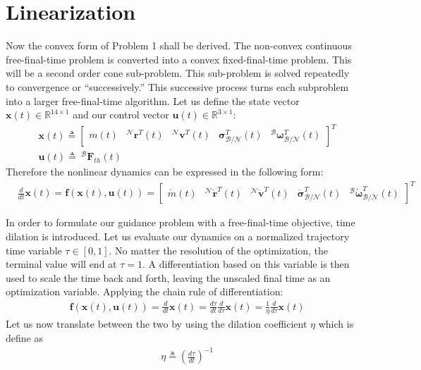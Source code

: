 \documentclass[conf]{new-aiaa}
\begin{document}

\section{Linearization}
Now the convex form of Problem 1 shall be derived. The non-convex continuous free-final-time problem is converted into a convex fixed-final-time problem. This will be a second order cone sub-problem. This sub-problem is solved repeatedly to convergence or ``successively.'' This successive process turns each subproblem into a larger free-final-time algorithm.
Let us define the state vector $\mathbf{x}(t) \in \mathbb{R}^{14\times 1}$ and our control vector $\mathbf{u}(t) \in \mathbb{R}^{3\times 1}$:
\begin{align}
& \mathbf{x}(t) \triangleq 
	\begin{bmatrix}
	m(t) & ^\mathcal{N}\mathbf{r}^T(t) & ^\mathcal{N}\mathbf{v}^T(t) & \boldsymbol{\sigma}_\mathcal{B/N}^T(t) & ^\mathcal{B}\bm{\omega}_\mathcal{B/N}^T(t)   
	\end{bmatrix}^T \\
& \mathbf{u}(t) \triangleq \ ^\mathcal{B}\mathbf{F}_{th}(t)  
\end{align}
Therefore the nonlinear dynamics can be expressed in the following form:
\begin{align}
& \frac{d}{dt}\mathbf{x}(t) = \mathbf{f}(\mathbf{x}(t), \mathbf{u}(t)) =  
	\begin{bmatrix}
	\dot{m}(t) & ^\mathcal{N}\dot{\mathbf{r}}^T(t) & ^\mathcal{N}\dot{\mathbf{v}}^T(t) & \dot{\boldsymbol{\sigma}}_\mathcal{B/N}^T(t) & ^\mathcal{B}\dot{\bm{\omega}}_\mathcal{B/N}^T(t)  
	\end{bmatrix}^T
\end{align}

In order to formulate our guidance problem with a free-final-time objective, time dilation is introduced. Let us evaluate our dynamics on a normalized trajectory time variable $\tau \in [0,1]$. No matter the resolution of the optimization, the terminal value will end at $\tau = 1$. A differentiation based on this variable is then used to scale the time back and forth, leaving the unscaled final time as an optimization variable. Applying the chain rule of differentiation: 
\begin{align}
& \mathbf{f}(\mathbf{x}(t) , \mathbf{u}(t)) =  \frac{d}{dt}\mathbf{x}(t) = \frac{d\tau}{dt} \frac{d}{d\tau}\mathbf{x}(t) =  \frac{1}{\eta}\frac{d}{d\tau}\mathbf{x}(t)
\end{align}
Let us now translate between the two by using the dilation coefficient $\eta$ which is define as
\begin{align}
& \eta \triangleq \left(\frac{d\tau}{dt}\right)^{-1}
\end{align}
\end{document}
